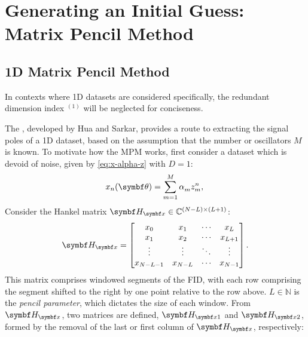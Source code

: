 \section{Generating an Initial Guess: Matrix Pencil Method}
\label{sec:mpm}

\subsection{1D Matrix Pencil Method}
\label{subsec:mpm}

\begin{remark}
    In contexts where \ac{1D} datasets are considered specifically, the
    redundant dimension index $^{(1)}$ will be neglected for conciseness.
\end{remark}
The , developed by Hua and Sarkar\cite{Hua1990,Hua1990b,Hua1991}, provides a
route to extracting the signal poles of a \ac{1D} dataset, based on the
assumption that the number or oscillators $M$ is known.
To motivate how the \ac{MPM} works, first consider a dataset which is devoid of
noise, given by \cref{eq:x-alpha-z} with $D=1$:
\begin{equation}
    x_n(\bth) = \sumM \alpha_m^{\vphantom{n}} z_m^n,\\
\end{equation}
Consider the Hankel matrix $\Hx \in \mathbb{C}^{(N-L) \times (L+1)}$:
\begin{equation}
    \Hx =
    \begin{bmatrix}
        x_0 & x_1 & \cdots & x_L\\
        x_1 & x_2 & \cdots & x_{L+1}\\
        \vdots & \vdots & \ddots & \vdots\\
        x_{N-L-1} & x_{N-L} & \cdots & x_{N-1}
    \end{bmatrix}.
\end{equation}
This matrix comprises windowed segments of the FID, with each row comprising
the segment shifted to the right by one point relative to the row above.
$L \in \mathbb{N}$ is the \emph{pencil parameter}, which dictates the size of
each window. From $\Hx$, two matrices are defined, $\Hxone$ and $\Hxtwo$,
formed by the removal of the last or first column of $\Hx$, respectively:
